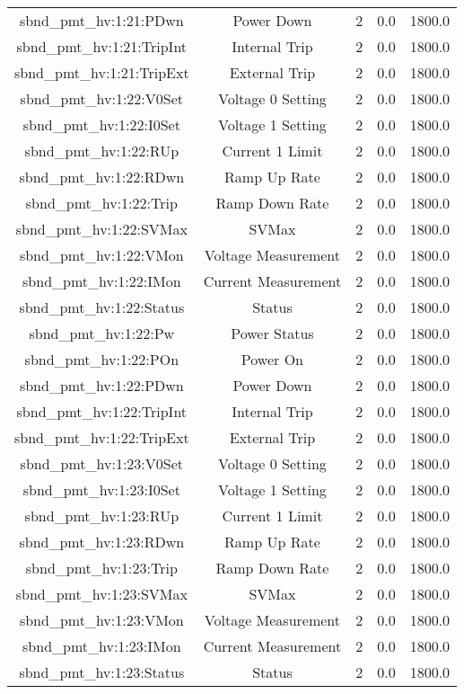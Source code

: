 \begin{table}[ptb]
\begin{tabular}{c | c c c c}
sbnd_pmt_hv:1:21:PDwn & Power Down & 2 & 0.0 & 1800.0\\ 
sbnd_pmt_hv:1:21:TripInt & Internal Trip & 2 & 0.0 & 1800.0\\ 
sbnd_pmt_hv:1:21:TripExt & External Trip & 2 & 0.0 & 1800.0\\ 
sbnd_pmt_hv:1:22:V0Set & Voltage 0 Setting & 2 & 0.0 & 1800.0\\ 
sbnd_pmt_hv:1:22:I0Set & Voltage 1 Setting & 2 & 0.0 & 1800.0\\ 
sbnd_pmt_hv:1:22:RUp & Current 1 Limit & 2 & 0.0 & 1800.0\\ 
sbnd_pmt_hv:1:22:RDwn & Ramp Up Rate & 2 & 0.0 & 1800.0\\ 
sbnd_pmt_hv:1:22:Trip & Ramp Down Rate & 2 & 0.0 & 1800.0\\ 
sbnd_pmt_hv:1:22:SVMax & SVMax & 2 & 0.0 & 1800.0\\ 
sbnd_pmt_hv:1:22:VMon & Voltage Measurement & 2 & 0.0 & 1800.0\\ 
sbnd_pmt_hv:1:22:IMon & Current Measurement & 2 & 0.0 & 1800.0\\ 
sbnd_pmt_hv:1:22:Status & Status & 2 & 0.0 & 1800.0\\ 
sbnd_pmt_hv:1:22:Pw & Power Status & 2 & 0.0 & 1800.0\\ 
sbnd_pmt_hv:1:22:POn & Power On & 2 & 0.0 & 1800.0\\ 
sbnd_pmt_hv:1:22:PDwn & Power Down & 2 & 0.0 & 1800.0\\ 
sbnd_pmt_hv:1:22:TripInt & Internal Trip & 2 & 0.0 & 1800.0\\ 
sbnd_pmt_hv:1:22:TripExt & External Trip & 2 & 0.0 & 1800.0\\ 
sbnd_pmt_hv:1:23:V0Set & Voltage 0 Setting & 2 & 0.0 & 1800.0\\ 
sbnd_pmt_hv:1:23:I0Set & Voltage 1 Setting & 2 & 0.0 & 1800.0\\ 
sbnd_pmt_hv:1:23:RUp & Current 1 Limit & 2 & 0.0 & 1800.0\\ 
sbnd_pmt_hv:1:23:RDwn & Ramp Up Rate & 2 & 0.0 & 1800.0\\ 
sbnd_pmt_hv:1:23:Trip & Ramp Down Rate & 2 & 0.0 & 1800.0\\ 
sbnd_pmt_hv:1:23:SVMax & SVMax & 2 & 0.0 & 1800.0\\ 
sbnd_pmt_hv:1:23:VMon & Voltage Measurement & 2 & 0.0 & 1800.0\\ 
sbnd_pmt_hv:1:23:IMon & Current Measurement & 2 & 0.0 & 1800.0\\ 
sbnd_pmt_hv:1:23:Status & Status & 2 & 0.0 & 1800.0\\ 

\end{tabular}
\end{table}
